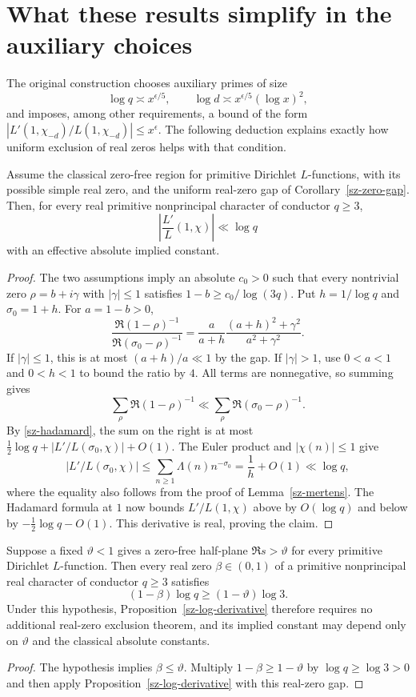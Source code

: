 \section{What these results simplify in the auxiliary choices}
\label{sz-integration}

The original construction chooses auxiliary primes of size
\[
 \log q\asymp x^{\epsilon/5},\qquad
 \log d\asymp x^{\epsilon/5}(\log x)^2,
\]
and imposes, among other requirements, a bound of the form
$|L'(1,\chi_{-d})/L(1,\chi_{-d})|\le x^\epsilon$.
The following deduction explains exactly how uniform exclusion of real
zeros helps with that condition.

\begin{proposition}\label{sz-log-derivative}
Assume the classical zero-free region for primitive Dirichlet $L$-functions,
with its possible simple real zero, and the uniform real-zero gap of
Corollary~\ref{sz-zero-gap}. Then, for every real primitive nonprincipal
character of conductor $q\ge3$,
\[
 \left|\frac{L'}{L}(1,\chi)\right|\ll\log q
\]
with an effective absolute implied constant.
\end{proposition}
\begin{proof}
The two assumptions imply an absolute $c_0>0$ such that every nontrivial
zero $\rho=b+i\gamma$ with $|\gamma|\le1$ satisfies
$1-b\ge c_0/\log(3q)$. Put $h=1/\log q$ and $\sigma_0=1+h$.
For $a=1-b>0$,
\[
 \frac{\Re(1-\rho)^{-1}}{\Re(\sigma_0-\rho)^{-1}}
 =\frac{a}{a+h}\frac{(a+h)^2+\gamma^2}{a^2+\gamma^2}.
\]
If $|\gamma|\le1$, this is at most $(a+h)/a\ll1$ by the gap.
If $|\gamma|>1$, use $0<a<1$ and $0<h<1$ to bound the ratio by $4$.
All terms are nonnegative, so summing gives
\[
 \sum_\rho\Re(1-\rho)^{-1}
 \ll\sum_\rho\Re(\sigma_0-\rho)^{-1}.
\]
By \eqref{sz-hadamard}, the sum on the right is at most
$\tfrac12\log q+|L'/L(\sigma_0,\chi)|+O(1)$.
The Euler product and $|\chi(n)|\le1$ give
\[
 |L'/L(\sigma_0,\chi)|
 \le\sum_{n\ge1}\Lambda(n)n^{-\sigma_0}
 =\frac1h+O(1)\ll\log q,
\]
where the equality also follows from the proof of
Lemma~\ref{sz-mertens}. The Hadamard formula at $1$ now bounds
$L'/L(1,\chi)$ above by $O(\log q)$ and below by
$-\tfrac12\log q-O(1)$. This derivative is real, proving the claim.
\end{proof}

\begin{corollary}\label{sz-qrh-real-gap}
Suppose a fixed $\vartheta<1$ gives a zero-free half-plane
$\Re s>\vartheta$ for every primitive Dirichlet $L$-function.
Then every real zero $\beta\in(0,1)$ of a primitive nonprincipal
real character of conductor $q\ge3$ satisfies
\[
 (1-\beta)\log q\ge(1-\vartheta)\log3.
\]
Under this hypothesis, Proposition~\ref{sz-log-derivative} therefore
requires no additional real-zero exclusion theorem, and its implied
constant may depend only on $\vartheta$ and the classical absolute
constants.
\end{corollary}
\begin{proof}
The hypothesis implies $\beta\le\vartheta$. Multiply
$1-\beta\ge1-\vartheta$ by $\log q\ge\log3>0$ and then apply
Proposition~\ref{sz-log-derivative} with this real-zero gap.
\end{proof}

